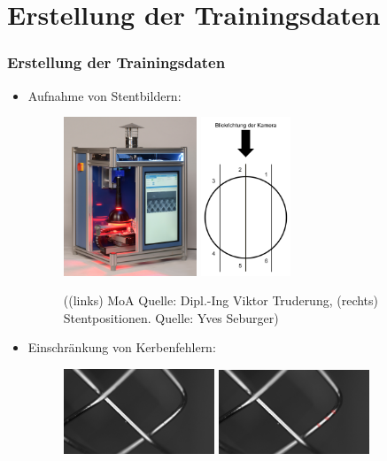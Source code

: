 \documentclass{beamer}
\begin{document}
\section{Erstellung der Trainingsdaten}
\begin{frame}[allowframebreaks]
\frametitle{Erstellung der Trainingsdaten}
\begin{itemize}
    \item Aufnahme von Stentbildern:
        \begin{figure}
            \includegraphics[height=4.75cm]{Bilder/MoA_Gesa_preversion_cut.jpg}
            \hspace{20px}
            \includegraphics[height=4.75cm]{Bilder/Stentpositionen.png}
            \caption{((links) MoA Quelle: Dipl.-Ing Viktor Truderung, (rechts) Stentpositionen. \scriptsize{Quelle: Yves Seburger})}
        \end{figure}
\end{itemize}
\begin{itemize}
    \item Einschränkung von Kerbenfehlern:
        \begin{figure}
            \includegraphics[width=4.5cm]{Bilder/Annotationfragen/Frage_5_crop.jpg}
            \includegraphics[width=4.5cm]{Bilder/Annotationfragen/Frage_5_anno.png}

\end{figure}
\end{itemize}
\end{frame}
\end{document}
